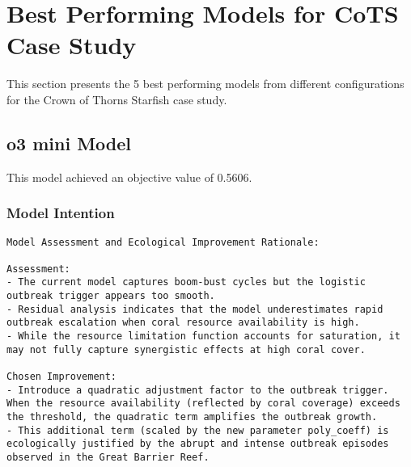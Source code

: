\section{Best Performing Models for CoTS Case Study}
\label{sec:best_models}
This section presents the 5 best performing models from different configurations for the Crown of Thorns Starfish case study.

\subsection{o3 mini Model}
This model achieved an objective value of 0.5606.

\subsubsection{Model Intention}
\begin{lstlisting}
Model Assessment and Ecological Improvement Rationale:

Assessment:
- The current model captures boom-bust cycles but the logistic outbreak trigger appears too smooth.
- Residual analysis indicates that the model underestimates rapid outbreak escalation when coral resource availability is high.
- While the resource limitation function accounts for saturation, it may not fully capture synergistic effects at high coral cover.

Chosen Improvement:
- Introduce a quadratic adjustment factor to the outbreak trigger. When the resource availability (reflected by coral coverage) exceeds the threshold, the quadratic term amplifies the outbreak growth.
- This additional term (scaled by the new parameter poly_coeff) is ecologically justified by the abrupt and intense outbreak episodes observed in the Great Barrier Reef.
\end{lstlisting}

